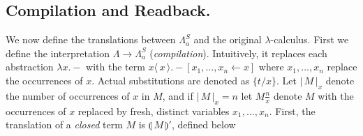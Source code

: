 \documentclass[runningheads]{llncs}
\newcommand{\FALC}{\Lambda^{S}_{a}}
\newcommand{\fake}[3]{#1 \langle \, #2 \, \rangle . #3}
\newcommand{\share}[3]{#1 [#2 \leftarrow #3]}
\newcommand{\size}[1]{\vert \, #1 \, \vert}
\newcommand{\sub}[3]{#1 \{ #2 / #3 \}}
\newcommand{\compile}[1]{\llparenthesis \, #1 \, \rrparenthesis}
\begin{document}
\subsection{Compilation and Readback.}
\label{sect:compandreadback}

We now define the translations between $\FALC$ and the original $\lambda$-calculus. First we define the interpretation $\Lambda \rightarrow \FALC$ (\emph{compilation}). Intuitively, it replaces each abstraction $\lambda x . -$ with the term $\fake{x}{x}{\share{-}{x_{1}, \dots, x_{n}}{x}}$ where $x_{1}, \dots, x_{n}$ replace the occurrences of $x$. Actual substitutions are denoted as $\sub{}{t}{x}$. Let $\size{M}_{x}$ denote the number of occurrences of $x$ in $M$, and if $\size{M}_{x} = n$ let $M \frac{n}{x}$ denote $M$ with the occurrences of $x$ replaced by fresh, distinct variables $x_{1}, \dots, x_{n}$. First, the translation of a \emph{closed} term $M$ is $\compile{M}'$, defined below
\end{document}
